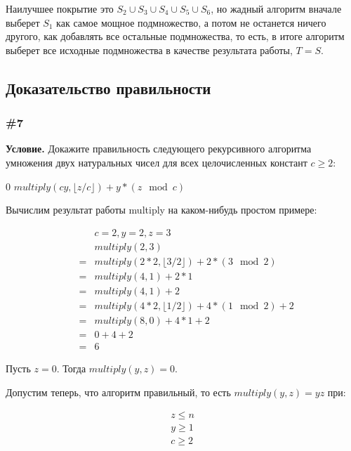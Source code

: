 \documentclass{article}
\begin{document}
Наилучшее покрытие это \(S_2 \cup S_3 \cup S_4 \cup S_5 \cup S_6\),
но жадный алгоритм вначале выберет \(S_1\) как самое мощное подмножество,
а потом не останется ничего другого, как добавлять все остальные подмножества,
то есть, в итоге алгоритм выберет все исходные подмножества в качестве результата работы, \(T = S\).

\subsection{Доказательство правильности}

\subsubsection{\#7}

\textbf{Условие.}
Докажите правильность следующего рекурсивного алгоритма умножения двух натуральных чисел
для всех целочисленных констант \(c \geqslant 2\):

\begin{algorithmic}[1]
        \State \Return $0$
    \Else
        \State \Return $multiply(cy, \lfloor z/c \rfloor) + y * (z \mod c)$
    \EndIf
\EndFunction
\end{algorithmic}
    
Вычислим результат работы multiply на каком-нибудь простом примере:

\begin{eqnarray}
&&c = 2, y = 2, z = 3 \\
&  & multiply(2, 3) \\
&= & multiply(2*2, \lfloor 3/2 \rfloor) + 2 * (3 \mod 2) \\
&= & multiply(4, 1) + 2 * 1 \\
&= & multiply(4, 1) + 2 \\
&= & multiply(4 * 2, \lfloor 1 /2 \rfloor) + 4 * (1 \mod 2) + 2 \\
&= & multiply(8, 0) + 4 * 1 + 2 \\
&= & 0 + 4 + 2 \\
&= & 6
\end{eqnarray}

Пусть $z = 0$.
Тогда $multiply(y, z) = 0$.

Допустим теперь, что алгоритм правильный, то есть \(multiply(y, z) = yz\) при:

\begin{eqnarray}
    z \leqslant n\\
    y \geqslant 1\\
    c \geqslant 2
\end{eqnarray}
\end{document}
